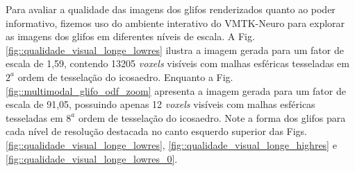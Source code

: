 
Para avaliar a qualidade das imagens dos glifos renderizados quanto ao poder informativo, fizemos uso do ambiente interativo do VMTK-Neuro para explorar as imagens dos glifos em diferentes níveis de escala. A Fig. \ref{fig::qualidade_visual_longe_lowres} ilustra a imagem gerada para um fator de escala de 1,59, contendo 13205 \textit{voxels} visíveis com malhas esféricas tesseladas em $2^a$ ordem de tesselação do icosaedro. Enquanto a Fig. \ref{fig::multimodal_glifo_odf_zoom} apresenta a imagem gerada para um fator de escala de 91,05, possuindo apenas 12 \textit{voxels} visíveis com malhas esféricas tesseladas em  $8^a$ ordem de tesselação do icosaedro. Note a forma dos glifos para cada nível de resolução destacada no canto esquerdo superior das Figs. \ref{fig::qualidade_visual_longe_lowres},  \ref{fig::qualidade_visual_longe_highres} e \ref{fig::qualidade_visual_longe_lowres_0}.


